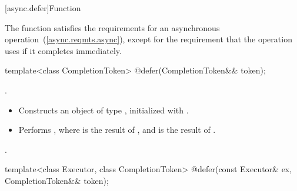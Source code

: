 [async.defer]{Function }

%
\pnum
\begin{note} The function  satisfies the requirements for an asynchronous operation~(\ref{async.reqmts.async}), except for the requirement that the operation uses  if it completes immediately. \end{note}

\begin{itemdecl}
template<class CompletionToken>
  @\DEDUCED@ defer(CompletionToken&& token);
\end{itemdecl}

\begin{itemdescr}
\pnum
\completionsig {}.

\pnum
\effects
\begin{itemize}
\item
 Constructs an object  of type , initialized with .
\item
 Performs , where  is the result of , and  is the result of .
\end{itemize}

\pnum
\returns {}.
\end{itemdescr}

\begin{itemdecl}
template<class Executor, class CompletionToken>
  @\DEDUCED@ defer(const Executor& ex, CompletionToken&& token);
\end{itemdecl}

